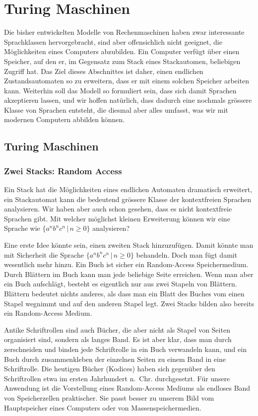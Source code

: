 %
%
%
\chapter{Turing Maschinen\label{chapter-turing}}
Die bisher entwickelten Modelle von Rechenmaschinen haben zwar
interessante Sprachklassen hervorgebracht, sind aber offensichlich nicht
geeignet, die Möglichkeiten eines Computers abzubilden. Ein
Computer verfügt über einen Speicher, auf den er, im Gegensatz zum
Stack eines Stackautomen, beliebigen Zugriff hat. Das Ziel dieses
Abschnittes ist daher, einen endlichen Zustandsautomaten so zu
erweitern, dass er mit einem solchen Speicher arbeiten kann.
Weiterhin soll das Modell so formuliert sein, dass sich damit
Sprachen akzeptieren lassen, und wir hoffen natürlich, dass dadurch
eine nochmals grössere Klasse von Sprachen entsteht, die diesmal
aber alles umfasst, was wir mit modernen Computern abbilden können.

\section{Turing Maschinen}
\subsection{Zwei Stacks: Random Access}
Ein Stack hat die Möglichkeiten eines endlichen Automaten dramatisch
erweitert, ein Stackautomat kann die bedeutend grössere Klasse der
kontextfreien Sprachen analysieren. Wir haben aber auch schon gesehen,
dass es nicht kontextfreie Sprachen gibt. Mit welcher möglichst kleinen
Erweiterung können wir eine Sprache wie $\{a^nb^nc^n\,|\, n\ge 0\}$
analysieren?

Eine erste Idee könnte sein, einen zweiten Stack hinzuzufügen.
Damit könnte man mit Sicherheit die Sprache $\{a^nb^nc^n\,|\,n\ge 0\}$
behandeln. Doch man fügt damit wesentlich mehr hinzu. Ein Buch ist
sicher ein Random-Access Speichermedium. Durch Blättern im Buch
kann man jede beliebige Seite erreichen. Wenn man aber ein Buch
aufschlägt, besteht es eigentlich nur aus zwei Stapeln von Blättern.
Blättern bedeutet nichts anderes, als dass man ein Blatt des Buches vom
einen Stapel wegnimmt und auf den anderen Stapel legt. Zwei Stacks
bilden also bereits ein Random-Access Medium.

Antike Schriftrollen sind auch Bücher, die aber nicht als Stapel
von Seiten organisiert sind, sondern als langes Band. Es ist aber klar,
dass man durch zerschneiden und binden jede Schriftrolle in ein
Buch verwandeln kann, und ein Buch durch zusammenkleben der einzelnen
Seiten zu einem Band in eine Schriftrolle.
Die heutigen Bücher (Kodices) haben sich gegenüber den Schriftrollen
etwa im ersten Jahrhundert n.~Chr. durchgesetzt.
Für unsere Anwendung ist die Vorstellung eines Random-Access Mediums
als endloses Band von Speicherzellen praktischer. Sie passt besser zu
unserem Bild vom Hauptspeicher eines Computers oder von Massenspeichermedien.
